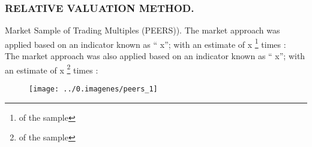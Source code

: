 \subsubsection{RELATIVE VALUATION METHOD.}

\textcolor{principal}{Market Sample of Trading Multiples  (PEERS))}. The market approach was applied based on an indicator known as ``\textcolor{principal}{\peersa} x''; with an estimate of \textcolor{principal}{\peersaMult x} \footnote{\peersaEst{} of the sample} times \peersaTo:\\



The market approach was also applied based on an indicator known as ``\textcolor{principal}{\peersb} x''; with an estimate of  \textcolor{principal}{\peersbMult x} \footnote{\peersbEst{} of the sample} times \peersbTo:\\

\begin{figure}[H]
\centering
\texttt{[image: ../0.imagenes/peers\_1]}
\end{figure}

%
%
%
%
%
%
%
%



